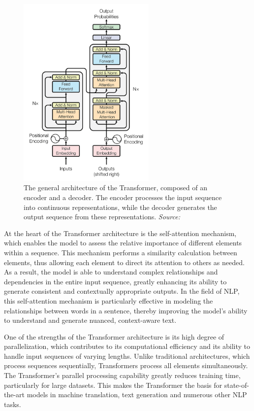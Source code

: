 \begin{figure}[h!]
    \centering
    \includegraphics[width=0.6\textwidth]{images/llms/transformer-architecture.png}
    \caption{The general architecture of the Transformer, composed of an encoder and a decoder. The encoder processes the input sequence into continuous representations, while the decoder generates the output sequence from these representations. \textit{Source:} \cite{vaswani2017attention}}
    \label{fig:transformer-architecture}
\end{figure}

At the heart of the Transformer architecture is the self-attention mechanism, which enables the model to assess the relative importance of different elements within a sequence. This mechanism performs a similarity calculation between elements, thus allowing each element to direct its attention to others as needed. As a result, the model is able to understand complex relationships and dependencies in the entire input sequence, greatly enhancing its ability to generate consistent and contextually appropriate outputs. In the field of NLP, this self-attention mechanism is particularly effective in modeling the relationships between words in a sentence, thereby improving the model's ability to understand and generate nuanced, context-aware text.

One of the strengths of the Transformer architecture is its high degree of parallelization, which contributes to its computational efficiency and its ability to handle input sequences of varying lengths. Unlike traditional architectures, which process sequences sequentially, Transformers process all elements simultaneously. The Transformer's parallel processing capability greatly reduces training time, particularly for large datasets. This makes the Transformer the basis for state-of-the-art models in machine translation, text generation and numerous other NLP tasks.

